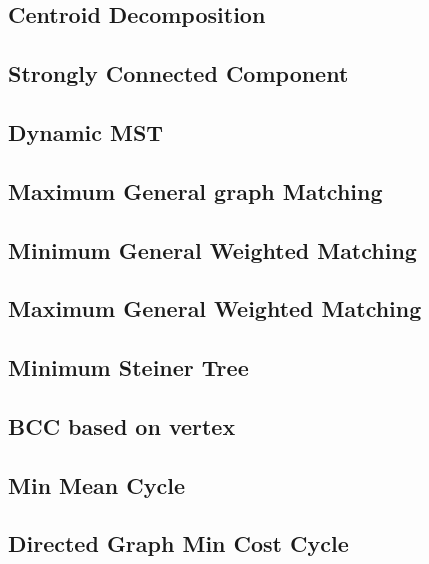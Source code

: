 \documentclass[a4paper,10pt,twocolumn,oneside]{article}
\begin{document}
\subsection{Centroid Decomposition}


\subsection{Strongly Connected Component}


\subsection{Dynamic MST}


\subsection{Maximum General graph Matching}


\subsection{Minimum General Weighted Matching}


\subsection{Maximum General Weighted Matching}


\subsection{Minimum Steiner Tree}


\subsection{BCC based on vertex}


\subsection{Min Mean Cycle}


\subsection{Directed Graph Min Cost Cycle}

\end{document}

